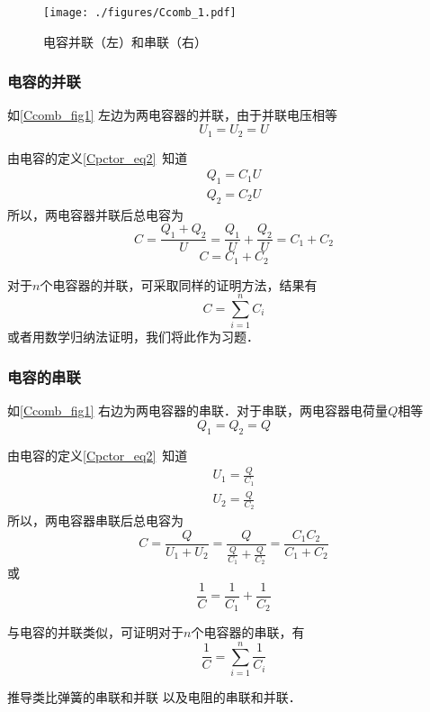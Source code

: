

\begin{figure}[ht]
\centering
\texttt{[image: ./figures/Ccomb\_1.pdf]}
\caption{电容并联（左）和串联（右）} \label{Ccomb_fig1}
\end{figure}

\subsubsection{电容的并联}
如\autoref{Ccomb_fig1} 左边为两电容器的并联，由于并联电压相等
\begin{equation}
U_1=U_2=U
\end{equation}

由电容的定义\autoref{Cpctor_eq2}~知道
\begin{equation}
\begin{aligned}
Q_1=C_1U\\
Q_2=C_2U
\end{aligned}
\end{equation}
所以，两电容器并联后总电容为
\begin{equation}
C=\frac{Q_1+Q_2}{U}=\frac{Q_1}{U}+\frac{Q_2}{U}=C_1+C_2
\end{equation}
\begin{equation}
C = C_1 + C_2
\end{equation}

对于$n$个电容器的并联，可采取同样的证明方法，结果有
\begin{equation}
C=\sum_{i=1}^{n}C_i
\end{equation}
或者用数学归纳法证明，我们将此作为习题．


\subsubsection{电容的串联}
如\autoref{Ccomb_fig1} 右边为两电容器的串联．对于串联，两电容器电荷量$Q$相等
\begin{equation}
Q_1=Q_2=Q
\end{equation}

由电容的定义\autoref{Cpctor_eq2}~知道
\begin{equation}
\begin{aligned}
U_1=\frac{Q}{C_1}\\
U_2=\frac{Q}{C_2}
\end{aligned}
\end{equation}
所以，两电容器串联后总电容为
\begin{equation}
{C} = \frac{Q}{U_1+U_2} = \frac{Q}{\frac{Q}{C_1}+\frac{Q}{C_2}} = \frac{C_1C_2}{C_1 + C_2}
\end{equation}
或
\begin{equation}
\frac{1}{C}=\frac{1}{C_1}+\frac{1}{C_2}
\end{equation}

与电容的并联类似，可证明对于$n$个电容器的串联，有
\begin{equation}
\frac{1}{C}=\sum_{i=1}^{n}\frac{1}{C_i}
\end{equation}

推导类比弹簧的串联和并联 以及电阻的串联和并联．
